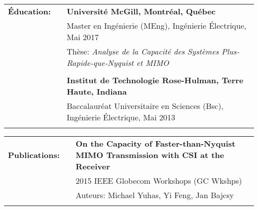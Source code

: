 \documentclass{minimal}
\begin{document}
\begin{tabular}{ p{1.5cm} p{1cm} p{16cm} }
\textbf{Éducation:} & & \textbf{Université McGill, Montréal, Québec} \\
& & Master en Ingénierie (MEng), Ingénierie Électrique, Mai 2017\\
& & Thèse: \textit{Analyse de la Capacité des Systèmes Plus-Rapide-que-Nyquist et MIMO}\\
& & \\
& & \textbf{Institut de Technologie Rose-Hulman, Terre Haute, Indiana} \\
& & Baccalauréat Universitaire en Sciences (Bsc), Ingénierie Électrique, Mai 2013\\
& & \\
\end{tabular}

\begin{tabular}{ p{1.5cm} p{1cm} p{16cm} }
\textbf{Publications:} & & \textbf{On the Capacity of Faster-than-Nyquist MIMO Transmission with CSI at the Receiver}\\
& & 2015 IEEE Globecom Workshops (GC Wkshps)\\
& & Auteurs: Michael Yuhas, Yi Feng, Jan Bajcsy\\
& & \\
\end{tabular}
\end{document}

